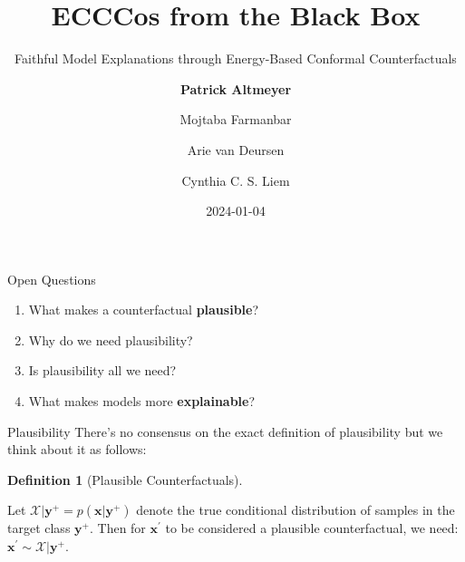 \documentclass[
  ignorenonframetext,
]{beamer}
\title{ECCCos from the Black Box}
\subtitle{Faithful Model Explanations through Energy-Based Conformal
Counterfactuals}
\author{\textbf{Patrick Altmeyer} \and Mojtaba Farmanbar \and Arie van
Deursen \and Cynthia C. S. Liem}
\date{2024-01-04}
\institute{Delft University of Technology}
\providecommand{\tightlist}{%
  \setlength{\itemsep}{0pt}\setlength{\parskip}{0pt}}\usepackage{longtable,booktabs,array}
\theoremstyle{definition}
\newtheorem{definition}{Definition}[section]
\theoremstyle{remark}
\begin{document}
\frame{\titlepage}

\begin{frame}{Open Questions}
\label{open-questions}
\begin{enumerate}[<+->]
\tightlist
\item
  What makes a counterfactual \textbf{plausible}?
\item
  Why do we need plausibility?
\item
  Is plausibility all we need?
\item
  What makes models more \textbf{explainable}?
\end{enumerate}
\end{frame}

\begin{frame}{Plausibility}
\label{plausibility}
There's no consensus on the exact definition of plausibility but we
think about it as follows:

\begin{definition}[Plausible
Counterfactuals]\protect\hypertarget{def-plausible}{}\label{def-plausible}

Let \(\mathcal{X}|\mathbf{y}^+= p(\mathbf{x}|\mathbf{y}^+)\) denote the
true conditional distribution of samples in the target class
\(\mathbf{y}^+\). Then for \(\mathbf{x}^{\prime}\) to be considered a
plausible counterfactual, we need:
\(\mathbf{x}^{\prime} \sim \mathcal{X}|\mathbf{y}^+\).

\end{definition}
\end{frame}
\end{document}
